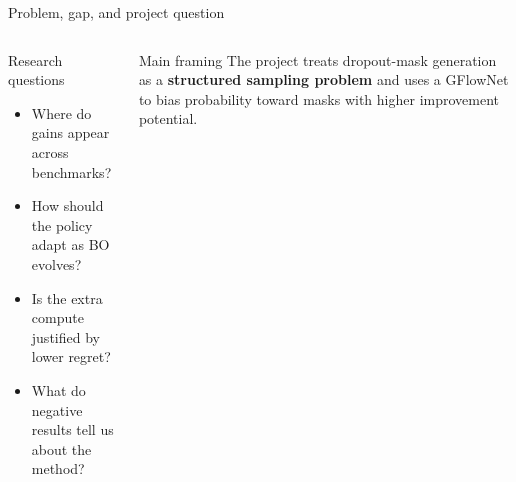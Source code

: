 \documentclass[aspectratio=169]{beamer}
\begin{document}
\begin{frame}{Problem, gap, and project question}
\begin{columns}[T,onlytextwidth]
\begin{minipage}[t][0.82\textheight]{\linewidth}
  \vfill

  \begin{card}{Research questions}
  \begin{itemize}
    \item Where do gains appear across benchmarks?
    \item How should the policy adapt as BO evolves?
    \item Is the extra compute justified by lower regret?
    \item What do negative results tell us about the method?
  \end{itemize}
  \end{card}

  \vfill

  \begin{card}{Main framing}
  The project treats dropout-mask generation as a \textbf{structured sampling problem} and uses a GFlowNet to bias probability toward masks with higher improvement potential.
  \end{card}
\end{minipage}
\end{columns}
\end{frame}
\end{document}
